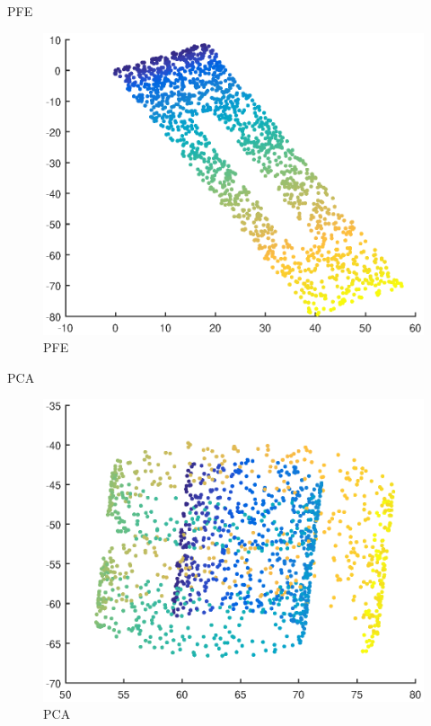 \documentclass{beamer}
\begin{document}
\begin{darkframes}
   
   \begin{frame}{PFE}
   \begin{figure}
   \centering
   \includegraphics[scale=0.5]{./figs/pfe.eps}
   \caption{PFE}
   \end{figure}
   \end{frame}
   
   
   \begin{frame}{PCA}
   \begin{figure}
   \centering
   \includegraphics[scale=0.5]{./figs/pca.eps}
   \caption{PCA}
   \end{figure}
   \end{frame}
   

\end{darkframes}
\end{document}
